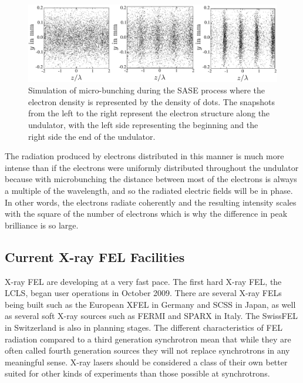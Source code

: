 \begin{figure}[h]
\centering
  \includegraphics[width=1.0 \columnwidth]{micro-bunching.png}
  \caption{Simulation of micro-bunching during the SASE process where the
    electron density is represented by the density of dots. The snapshots
    from the left to the right represent the electron structure along the
    undulator, with the left side representing the beginning and the right side
    the end of the undulator. \cite{Materlik2001TESLA}}
  \label{Fig:Brilliance}
\end{figure}

The radiation produced by electrons distributed in this manner is much more
intense than if the electrons were uniformly distributed throughout the
undulator because with microbunching the distance between most of the electrons is
always a multiple of the wavelength, and so the radiated electric fields will be
in phase. In other words, the electrons radiate coherently and the resulting
intensity scales with the square of the number of electrons which is why the
difference in peak brilliance is so large.

\subsection{Current X-ray FEL Facilities}

X-ray FEL are developing at a very fast pace. The first hard X-ray FEL, the LCLS,
began user operations in October 2009.
There are several X-ray FELs
being built such as the European XFEL in Germany and SCSS
in Japan,
as well as several soft X-ray sources such as FERMI and SPARX
in Italy. The SwissFEL in Switzerland is also in planning stages. 
The different characteristics of FEL radiation compared to a third generation synchrotron mean that while they are
often called fourth generation sources they will not replace synchrotrons in any
meaningful sense.
X-ray lasers should be considered a class of
their own better suited for other kinds of experiments than those possible at synchrotrons.

